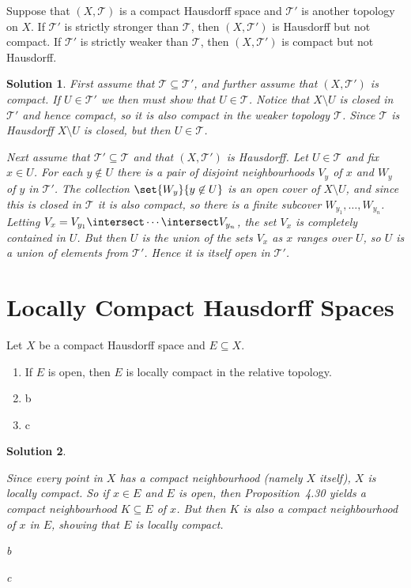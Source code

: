 \documentclass[article, a4paper, 11pt, oneside]{memoir}
\numberwithin{equation}{chapter}
\newcommand{\calT}{\mathcal{T}}
\theoremstyle{nonumberplain}
\newtheorem{solution}{Solution}
\begin{document}
\begin{exerciseframed*}[38]
	Suppose that $(X,\calT)$ is a compact Hausdorff space and $\calT'$ is another topology on $X$. If $\calT'$ is strictly stronger than $\calT$, then $(X,\calT')$ is Hausdorff but not compact. If $\calT'$ is strictly weaker than $\calT$, then $(X,\calT')$ is compact but not Hausdorff.
\end{exerciseframed*}

\begin{solution}
	First assume that $\calT \subseteq \calT'$, and further assume that $(X,\calT')$ is compact. If $U \in \calT'$ we then must show that $U \in \calT$. Notice that $X \setminus U$ is closed in $\calT'$ and hence compact, so it is also compact in the weaker topology $\calT$. Since $\calT$ is Hausdorff $X \setminus U$ is closed, but then $U \in \calT$.

	Next assume that $\calT' \subseteq \calT$ and that $(X,\calT')$ is Hausdorff. Let $U \in \calT$ and fix $x \in U$. For each $y \not\in U$ there is a pair of disjoint neighbourhoods $V_y$ of $x$ and $W_y$ of $y$ in $\calT'$. The collection $\set{W_y}{y \not\in U}$ is an open cover of $X \setminus U$, and since this is closed in $\calT$ it is also compact, so there is a finite subcover $W_{y_1}, \ldots, W_{y_n}$. Letting $V_x = V_{y_1} \intersect \cdots \intersect V_{y_n}$, the set $V_x$ is completely contained in $U$. But then $U$ is the union of the sets $V_x$ as $x$ ranges over $U$, so $U$ is a union of elements from $\calT'$. Hence it is itself open in $\calT'$.
\end{solution}


\section{Locally Compact Hausdorff Spaces}

\begin{exerciseframed*}[49]
	Let $X$ be a compact Hausdorff space and $E \subseteq X$.
	\begin{enumerate}
		\item If $E$ is open, then $E$ is locally compact in the relative topology.
		\item b
		\item c
	\end{enumerate}
\end{exerciseframed*}

\begin{solution}
\begin{solutionsec}
	\item Since every point in $X$ has a compact neighbourhood (namely $X$ itself), $X$ is locally compact. So if $x \in E$ and $E$ is open, then Proposition~4.30 yields a compact neighbourhood $K \subseteq E$ of $x$. But then $K$ is also a compact neighbourhood of $x$ in $E$, showing that $E$ is locally compact.
	
	\item b
	\item c
\end{solutionsec}
\end{solution}
\end{document}
